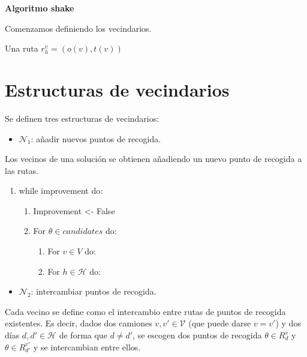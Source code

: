\documentclass[
]{article}
\providecommand{\tightlist}{%
  \setlength{\itemsep}{0pt}\setlength{\parskip}{0pt}}
\begin{document}
\textbf{Algoritmo shake}

Comenzamos definiendo los vecindarios.

Una ruta \(r_h^v = (o(v), t(v))\)

\hypertarget{estructuras-de-vecindarios}{%
\section{Estructuras de vecindarios}\label{estructuras-de-vecindarios}}

Se definen tres estructuras de vecindarios:

\begin{itemize}
\tightlist
\item
  \(\mathcal{N}_1\): añadir nuevos puntos de recogida.
\end{itemize}

Los vecinos de una solución se obtienen añadiendo un nuevo punto de
recogida a las rutas.

\begin{enumerate}
\def\labelenumi{\arabic{enumi}.}
\tightlist
\item
  while improvement do:

  \begin{enumerate}
  \def\labelenumii{\arabic{enumii}.}
  \tightlist
  \item
    Improvement \textless- False
  \item
    For \(\theta \in candidates\) do:

    \begin{enumerate}
    \def\labelenumiii{\arabic{enumiii}.}
    \tightlist
    \item
      For \(v\in V\) do:
    \item
      For \(h\in \mathcal{H}\) do:
    \end{enumerate}
  \end{enumerate}
\end{enumerate}

\begin{itemize}
\tightlist
\item
  \(\mathcal{N}_2\): intercambiar puntos de recogida.
\end{itemize}

Cada vecino se define como el intercambio entre rutas de puntos de
recogida existentes. Es decir, dados dos camiones
\(v, v'\in \mathcal{V}\) (que puede darse \(v = v'\)) y dos días
\(d, d' \in \mathcal{H}\) de forma que \(d\neq d'\), se escogen dos
puntos de recogida \(\theta\in R_{d}^v\) y \(\theta\in R_{d'}^{v'}\) y
se intercambian entre ellos.
\end{document}
